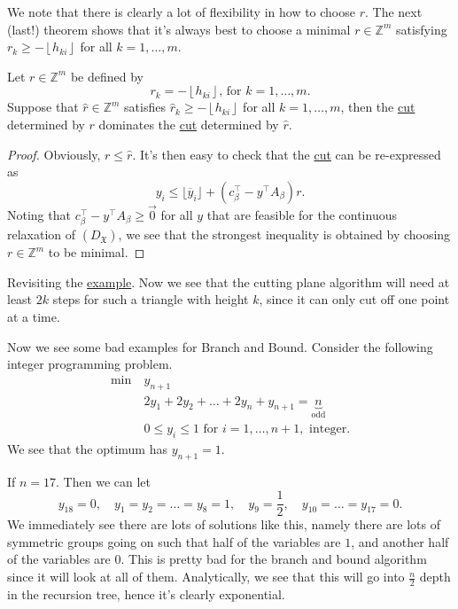 We note that there is clearly a lot of flexibility in how to choose \(r\). The next (last!) theorem shows
that it's always best to choose a minimal \(r\in \mathbb{Z} ^m\)  satisfying \(r_k \geq -\left\lfloor h_{ki} \right\rfloor\) for all \(k = 1, \ldots  , m\).

\begin{theorem}\label{thm:lec24-3}
	Let \(r\in \mathbb{Z} ^m\) be defined by
	\[
		r_k = -\left\lfloor h_{ki} \right\rfloor\text{, for }k = 1, \ldots , m.
	\]
	Suppose that \(\hat{r} \in \mathbb{Z} ^m\) satisfies \(\hat{r}_k \geq -\left\lfloor h_{ki} \right\rfloor\) for all \(k = 1, \ldots , m\), then
	the \hyperref[def:Chvatal-Gomory-cut]{cut} determined by \(r\) dominates the \hyperref[def:Chvatal-Gomory-cut]{cut} determined by \(\hat{r} \).
\end{theorem}
\begin{proof}
	Obviously, \(r \leq \hat{r} \). It's then easy to check that the \hyperref[def:Chvatal-Gomory-cut]{cut} can be re-expressed as
	\[
		y_{i} \leq \lfloor \overline{y} _{i} \rfloor + (c^{\top} _\beta - y^{\top} A_\beta )r.
	\]
	Noting that \(c^{\top} _\beta - y^{\top} A_\beta \geq \vec{0} \) for all \(y\) that are feasible for the continuous relaxation of \((D_{\mathfrak{X}})\),
	we see that the strongest inequality is obtained by choosing \(r\in\mathbb{Z} ^m\) to be minimal.
\end{proof}

Revisiting the \hyperref[eg:branch-and-bound]{example}. Now we see that the cutting plane algorithm will need at least \(2k\) steps
for such a triangle with height \(k\), since it can only cut off one point at a time.

\begin{eg}
	Now we see some bad examples for Branch and Bound. Consider the following integer programming problem.
	\[
		\begin{aligned}
			\min~ & y_{n+1}                                                              \\
			      & 2y_{1} + 2y_2 + \ldots +2y_n + y_{n+1} = \underbrace{n}_{\text{odd}} \\
			      & 0\leq y_{i}\leq 1 \text{ for }i = 1, \ldots , n+1, \text{ integer}.
		\end{aligned}
	\]
	We see that the optimum has \(y_{n+1} = 1\).

	If \(n = 17\). Then we can let
	\[
		y_{18} = 0,\quad y_1 = y_2 = \ldots = y_8 = 1,\quad y_9 = \frac{1}{2},\quad y_{10} = \ldots = y_{17} = 0.
	\]
	We immediately see there are lots of solutions like this, namely there are lots of symmetric groups going on such that
	half of the variables are \(1\), and another half of the variables are \(0\). This is pretty bad
	for the branch and bound algorithm since it will look at all of them. Analytically, we see that this will go into \(\frac{n}{2}\)
	depth in the recursion tree, hence it's clearly exponential.
\end{eg}


